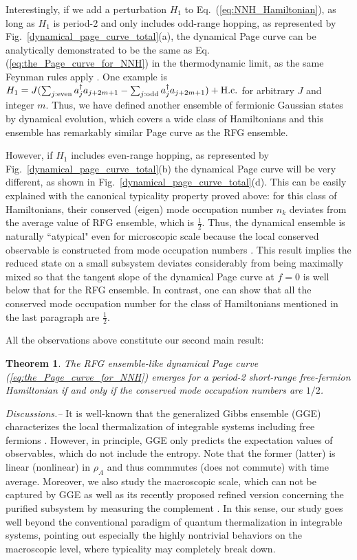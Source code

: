 \documentclass[twocolumn,english,prl,aps,superscriptaddress,amsmath,amssymb,floatfix]{revtex4-2}
\newtheorem{theorem}{Theorem}
\begin{document}
Interestingly, if we add a perturbation $H_{1}$ to Eq.~(\ref{eq:NNH_Hamiltonian}),
as long as $H_{1}$ is period-2 
and only includes odd-range hopping, as represented by Fig.~\ref{dynamical_page_curve_total}(a),  
the dynamical Page curve can be analytically demonstrated 
to be the same as Eq. (\ref{eq:the_Page_curve_for_NNH}) in the thermodynamic 
limit, as the same Feynman rules apply \cite{SM}. 
One example 
is $H_{1}=J(\sum_{j:\mathrm{even}}a_{j}^{\dagger}a_{j+2m+1}-\sum_{j:\mathrm{odd}}a_{j}^{\dagger}a_{j+2m+1})+{\rm H.c.}$
for arbitrary $J$ and integer $m$. Thus, we have defined another ensemble
of fermionic Gaussian states by dynamical evolution, which covers a
wide class of Hamiltonians and this ensemble has remarkably similar
Page curve as the RFG ensemble. 

However, if $H_{1}$ includes even-range 
hopping, as represented by Fig.~\ref{dynamical_page_curve_total}(b) 
the dynamical Page curve will be very different, 
as shown in Fig.~\ref{dynamical_page_curve_total}(d).
This can be easily explained with the canonical typicality property
proved above: for this class of Hamiltonians, their conserved (eigen) mode
occupation number $n_{k}$ deviates from the average value of RFG ensemble,
which is 
$\frac{1}{2}$. 
Thus, the dynamical ensemble is naturally 
``atypical" even for microscopic scale because the local conserved observable is constructed from mode occupation numbers \citep{Ishii2019}. This result implies the reduced state on a small subsystem deviates considerably from being maximally mixed so that the tangent slope of the dynamical Page curve at $f=0$ is well below that for the RFG ensemble.
In contrast, one can show that all the conserved mode occupation number for the class of Hamiltonians mentioned in the last paragraph are $\frac{1}{2}$. 

All the observations above constitute our second main result: 
\begin{theorem}
The RFG ensemble-like dynamical Page curve (\ref{eq:the_Page_curve_for_NNH}) emerges for a period-2 short-range free-fermion Hamiltonian if and only if the conserved mode occupation numbers are $1/2$. 
\end{theorem}




\emph{Discussions.--}
It is well-known that the generalized Gibbs ensemble (GGE) 
characterizes 
the local thermalization of integrable systems including free fermions \citep{PhysRevLett.98.050405, Cassidy2011,doi:10.1126/science.1257026, Essler2016,Ishii2019}. 
However, in principle,
GGE only predicts the expectation values of observables, which do not include the entropy. Note that the former (latter) is linear (nonlinear) in $\rho_A$ and thus commmutes (does not commute) with time average. 
Moreover, 
we also study the macroscopic scale, which can not be captured by GGE as well as its recently proposed refined version \cite{Lucas2022} concerning the purified subsystem by measuring the complement 
\cite{Ho2022}. In this sense, our study goes well beyond the conventional paradigm of quantum thermalization in integrable systems, pointing out especially the highly nontrivial behaviors on the macroscopic level, where typicality may completely break down. 
\end{document}
